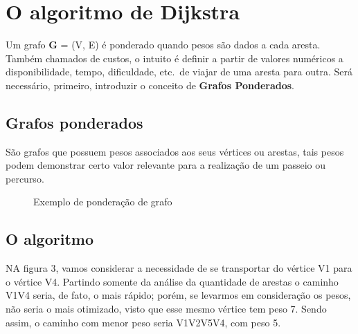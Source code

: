 \documentclass[a4paper, 12pt]{article}
\begin{document}
\section{O algoritmo de Dijkstra}
Um grafo \textbf{G} = (V, E) é ponderado quando pesos são dados a cada aresta. Também chamados de custos, o intuito é definir a partir de valores numéricos a disponibilidade, tempo, dificuldade, etc.\ de viajar de uma aresta para outra. Será necessário, primeiro, introduzir o conceito de \textbf{Grafos Ponderados}.
\subsection{Grafos ponderados}

São grafos que possuem pesos associados aos seus vértices ou arestas, tais pesos podem demonstrar certo valor relevante para a realização de um passeio ou percurso.

\begin{figure}[!hbt]
        \begin{center}
	    \caption{Exemplo de ponderação de grafo}

        \end{center}
    \end{figure}

\newpage
\subsection{O algoritmo}

NA figura 3, vamos considerar a necessidade de se transportar do vértice V1 para o vértice V4. Partindo somente da análise da quantidade de arestas o caminho V1V4 seria, de fato, o mais rápido; porém, se levarmos em consideração os pesos, não seria o mais otimizado, visto que esse mesmo vértice tem peso 7. Sendo assim, o caminho com menor peso seria V1V2V5V4, com peso 5. 
\end{document}
